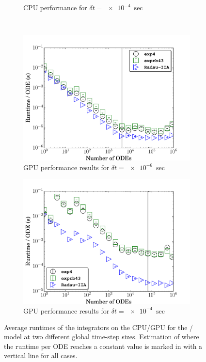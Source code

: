 \documentclass[final,twocolumn]{elsarticle}
\begin{document}
\begin{figure}[htb]
\begin{subfigure}{0.49\textwidth}
      \caption{CPU performance for $\delta t = \SI{e-4}{\sec}$}
      \label{F:h2_cpu_perf_large}
  \end{subfigure}\\
  \begin{subfigure}{0.49\textwidth}
      \includegraphics[width=\linewidth]{H2_1e-06_gpu.pdf}
      \caption{GPU performance results for $\delta t = \SI{e-6}{\sec}$}
      \label{F:h2_gpu_perf_small}
  \end{subfigure}
  \begin{subfigure}{0.49\textwidth}
      \includegraphics[width=\linewidth]{H2_1e-04_gpu.pdf}
      \caption{GPU performance results for $\delta t = \SI{e-4}{\sec}$}
      \label{F:h2_gpu_perf_large}
  \end{subfigure}
  \caption{Average runtimes of the integrators on the CPU\slash GPU for the \slash{} model at two different global time-step sizes.
  Estimation of where the runtime per ODE reaches a constant value is marked in with a vertical line for all cases.}
  \label{F:H2_perf}
\end{figure}
\end{document}
